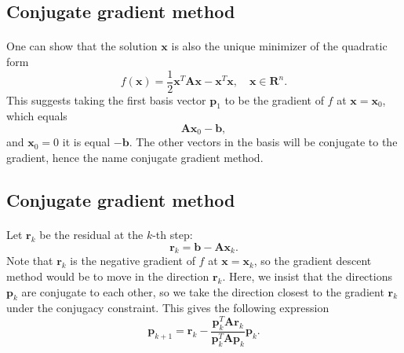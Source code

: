 \documentclass[%
oneside,                 %
final,                   %
10pt]{article}
\begin{document}
\subsection*{Conjugate gradient method}

\paragraph{}
One can show that the solution $\bm{x}$ is also the unique minimizer of the quadratic form
\begin{equation*}
  f(\bm{x}) = \frac{1}{2}\bm{x}^T\bm{A}\bm{x} - \bm{x}^T \bm{x} , \quad \bm{x}\in\mathbf{R}^n. 
\end{equation*}
This suggests taking the first basis vector $\bm{p}_1$ 
to be the gradient of $f$ at $\bm{x}=\bm{x}_0$, 
which equals
\begin{equation*}
\bm{A}\bm{x}_0-\bm{b},
\end{equation*}
and 
$\bm{x}_0=0$ it is equal $-\bm{b}$.
The other vectors in the basis will be conjugate to the gradient, 
hence the name conjugate gradient method.




\subsection*{Conjugate gradient method}

\paragraph{}
Let  $\bm{r}_k$ be the residual at the $k$-th step:
\begin{equation*}
\bm{r}_k=\bm{b}-\bm{A}\bm{x}_k.
\end{equation*}
Note that $\bm{r}_k$ is the negative gradient of $f$ at 
$\bm{x}=\bm{x}_k$, 
so the gradient descent method would be to move in the direction $\bm{r}_k$. 
Here, we insist that the directions $\bm{p}_k$ are conjugate to each other, 
so we take the direction closest to the gradient $\bm{r}_k$  
under the conjugacy constraint. 
This gives the following expression
\begin{equation*}
\bm{p}_{k+1}=\bm{r}_k-\frac{\bm{p}_k^T \bm{A}\bm{r}_k}{\bm{p}_k^T\bm{A}\bm{p}_k} \bm{p}_k.
\end{equation*}
\end{document}
